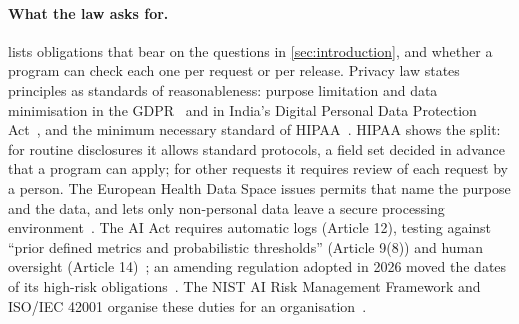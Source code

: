 \paragraph{What the law asks for.}  lists obligations
that bear on the questions in \cref{sec:introduction}, and whether a program can
check each one per request or per release. Privacy law states principles as
standards of reasonableness: purpose limitation and data minimisation in the
GDPR~\citep{eu2016gdpr} and in India's Digital Personal Data Protection
Act~\citep{india2023dpdp,india2025dpdprules}, and the minimum necessary standard
of HIPAA~\citep{ecfr2026part164,hhs2026minimum}. HIPAA shows the split: for
routine disclosures it allows standard protocols, a field set decided in advance
that a program can apply; for other requests it requires review of each
request by a person. The European Health Data Space issues permits that name the
purpose and the data, and lets only non-personal data leave a secure processing
environment~\citep{eu2025ehds}. The AI Act requires automatic logs (Article 12),
testing against ``prior defined metrics and probabilistic thresholds''
(Article 9(8)) and human oversight (Article 14)~\citep{eu2024aiact}; an
amending regulation adopted in 2026 moved the dates of its high-risk
obligations~\citep{eu2026omnibus}. The NIST AI Risk Management Framework and
ISO/IEC 42001 organise these duties for an
organisation~\citep{tabassi2023nist,iso2023iec42001}.

